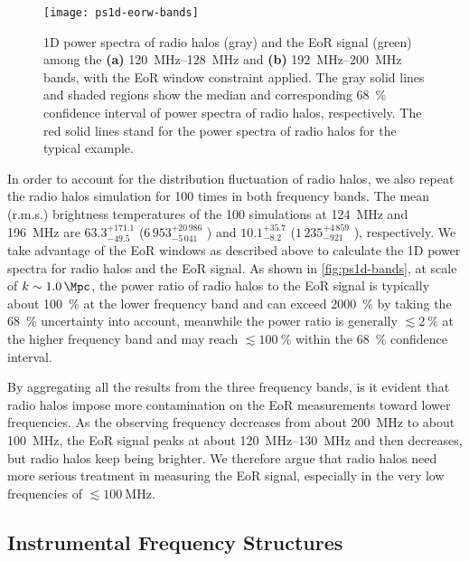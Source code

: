 \documentclass[modern]{aastex62}
\begin{document}
\begin{figure}
  \centering
  \texttt{[image: ps1d-eorw-bands]}
  \caption{\label{fig:ps1d-bands}%
    1D power spectra of radio halos (gray) and the EoR signal (green)
    among the
    \textbf{(a)} \SIrange{120}{128}{\MHz} and
    \textbf{(b)} \SIrange{192}{200}{\MHz} bands,
    with the EoR window constraint applied.
    The gray solid lines and shaded regions show the median and
    corresponding \SI{68}{\percent} confidence interval of power spectra
    of radio halos, respectively.
    The red solid lines stand for the power spectra of radio halos for
    the typical example.
  }
\end{figure}

In order to account for the distribution fluctuation of radio halos, we
also repeat the radio halos simulation for 100 times in both frequency
bands.
The mean (r.m.s.) brightness temperatures of the 100 simulations at
\SI{124}{\MHz} and \SI{196}{\MHz} are
$63.3_{-49.5}^{+171.1}$ \si{\mK} ($6\,953_{-5\,041}^{+20\,986}$ \si{\mK})
and
$10.1_{-8.2}^{+35.7}$ \si{\mK} ($1\,235_{-921}^{+4\,859}$ \si{\mK}),
respectively.
We take advantage of the EoR windows as described above to calculate the
1D power spectra for radio halos and the EoR signal.
As shown in \autoref{fig:ps1d-bands}, at scale of $k \sim \SI{1.0}{\per\Mpc}$,
the power ratio of radio halos to the EoR signal is typically about
\SI{100}{\percent} at the lower frequency band and can exceed
\SI{2000}{\percent} by taking the \SI{68}{\percent} uncertainty into
account,
meanwhile the power ratio is generally $\lesssim \SI{2}{\percent}$ at
the higher frequency band and may reach $\lesssim \SI{100}{\percent}$
within the \SI{68}{\percent} confidence interval.

By aggregating all the results from the three frequency bands, is it
evident that radio halos impose more contamination on the EoR measurements
toward lower frequencies.
As the observing frequency decreases from about \SI{200}{\MHz} to about
\SI{100}{\MHz}, the EoR signal peaks at about \SIrange{120}{130}{\MHz}
\citep{mesinger2016} and then decreases, but radio halos keep being
brighter.
We therefore argue that radio halos need more serious treatment in
measuring the EoR signal, especially in the very low frequencies of
$\lesssim \SI{100}{\MHz}$.

\subsection{Instrumental Frequency Structures}
\label{sec:freq-structures}
\end{document}
